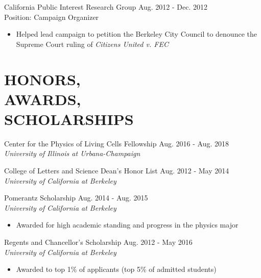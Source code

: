 \documentclass[margin, 10pt]{res} %
\begin{document}
\begin{resume}
California Public Interest Research Group \hfill Aug. 2012 - Dec. 2012 \\
{\normalfont Position: Campaign Organizer}
\begin{itemize}
\item {\normalfont Helped lead campaign to petition the Berkeley City Council to denounce the Supreme Court ruling of} {\sl Citizens United v. FEC}
\end{itemize}

\section{HONORS,\\ AWARDS, \\ SCHOLARSHIPS}

Center for the Physics of Living Cells Fellowship \hfill Aug. 2016 - Aug. 2018\\
{\sl University of Illinois at Urbana-Champaign}

College of Letters and Science Dean's Honor List \hfill Aug. 2012 - May 2014\\
{\sl University of California at Berkeley}

Pomerantz Scholarship \hfill Aug. 2014 - Aug. 2015\\
{\sl University of California at Berkeley}
\begin{itemize}
\item {\normalfont Awarded for high academic standing and progress in the physics major }
\end{itemize}

Regents and Chancellor's Scholarship \hfill Aug. 2012 - May 2016\\
{\sl University of California at Berkeley}
\begin{itemize}
\item {\normalfont Awarded to top 1\% of applicants (top 5\% of admitted students)}
\end{itemize}

\end{resume}
\end{document}
